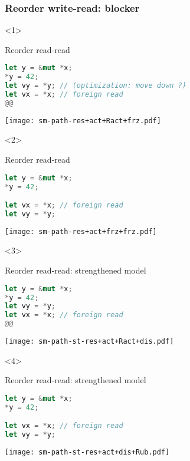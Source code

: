 \begin{frame}[fragile, t]
    \frametitle{Reorder write-read: blocker}
    \begin{onlyenv}<1>
        \begin{block}{{\cmark} Reorder read-read\vphantom{gh}}
            \begin{lstlisting}[language=rust, escapechar=@]
let y = &mut *x;
*y = 42;
let vy = *y; // (optimization: move down ?)
let vx = *x; // foreign read
@@
            \end{lstlisting}
        \end{block}
        \texttt{[image: sm-path-res+act+Ract+frz.pdf]}
    \end{onlyenv}

    \begin{onlyenv}<2>
        \begin{block}{{\cmark} Reorder read-read\vphantom{gh}}
            \begin{lstlisting}[language=rust]
let y = &mut *x;
*y = 42;

let vx = *x; // foreign read
let vy = *y;
            \end{lstlisting}
        \end{block}
        \texttt{[image: sm-path-res+act+frz+frz.pdf]}
    \end{onlyenv}

    \begin{onlyenv}<3>
        \begin{block}{{\xmark} Reorder read-read: strengthened model}
            \begin{lstlisting}[language=rust, escapechar=@]
let y = &mut *x;
*y = 42;
let vy = *y;
let vx = *x; // foreign read
@@
            \end{lstlisting}
        \end{block}
        \texttt{[image: sm-path-st-res+act+Ract+dis.pdf]}
    \end{onlyenv}

    \begin{onlyenv}<4>
        \begin{block}{{\xmark} Reorder read-read: strengthened model}
            \begin{lstlisting}[language=rust]
let y = &mut *x;
*y = 42;

let vx = *x; // foreign read
let vy = *y;
            \end{lstlisting}
        \end{block}
        \texttt{[image: sm-path-st-res+act+dis+Rub.pdf]}
    \end{onlyenv}
\end{frame}

